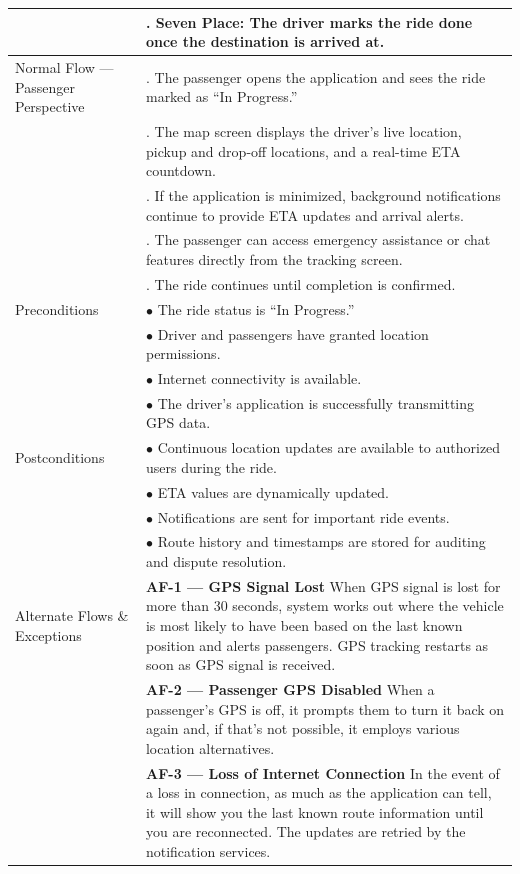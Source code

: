\begin{longtable}{|>{\raggedright\arraybackslash}p{4cm}|>{\raggedright\arraybackslash}p{11cm}|}
&7. Seven Place: The driver marks the ride done once the destination is arrived at. \\
\hline
Normal Flow — Passenger Perspective 
& 1. The passenger opens the application and sees the ride marked as “In Progress.” \\
& 2. The map screen displays the driver’s live location, pickup and drop-off locations, and a real-time ETA countdown. \\
& 3. If the application is minimized, background notifications continue to provide ETA updates and arrival alerts. \\
& 4. The passenger can access emergency assistance or chat features directly from the tracking screen. \\
& 5. The ride continues until completion is confirmed. \\
\hline
Preconditions & $\bullet$ The ride status is “In Progress.” \\
& $\bullet$ Driver and passengers have granted location permissions. \\
& $\bullet$ Internet connectivity is available. \\
& $\bullet$ The driver’s application is successfully transmitting GPS data. \\
\hline
Postconditions & $\bullet$ Continuous location updates are available to authorized users during the ride. \\
& $\bullet$ ETA values are dynamically updated. \\
& $\bullet$ Notifications are sent for important ride events. \\
& $\bullet$ Route history and timestamps are stored for auditing and dispute resolution. \\
\hline
Alternate Flows \& Exceptions 
& \textbf{AF-1 — GPS Signal Lost} \newline When GPS signal is lost for more than 30 seconds, system works out where the vehicle is most likely to have been based on the last known position and alerts passengers. GPS tracking restarts as soon as GPS signal is received. \\
& \textbf{AF-2 — Passenger GPS Disabled} \newline When a passenger's GPS is off, it prompts them to turn it back on again and, if that's not possible, it employs various location alternatives. \\
& \textbf{AF-3 — Loss of Internet Connection} \newline In the event of a loss in connection, as much as the application can tell, it will show you the last known route information until you are reconnected. The updates are retried by the notification services. \\

\end{longtable}
